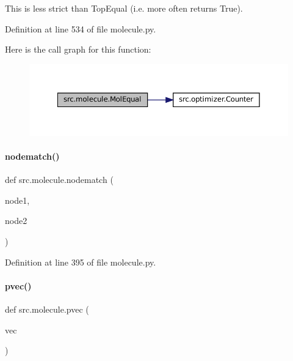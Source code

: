 This is less strict than Top\+Equal (i.\+e. more often returns True). 

Definition at line 534 of file molecule.\+py.

Here is the call graph for this function\+:
\nopagebreak
\begin{figure}[H]
\begin{center}
\leavevmode
\includegraphics[width=350pt]{namespacesrc_1_1molecule_a6b9b3403d57a07cf94d7a47a73e67da8_cgraph}
\end{center}
\end{figure}
\mbox{\label{namespacesrc_1_1molecule_a5928a44288a03b8c3ff61204feaa054b}} 
\paragraph{\texorpdfstring{nodematch()}{nodematch()}}
{\footnotesize\ttfamily def src.\+molecule.\+nodematch (\begin{DoxyParamCaption}\item[{}]{node1,  }\item[{}]{node2 }\end{DoxyParamCaption})}



Definition at line 395 of file molecule.\+py.

\mbox{\label{namespacesrc_1_1molecule_a5faf08001b21d2b7dae569cb9aecba15}} 
\paragraph{\texorpdfstring{pvec()}{pvec()}}
{\footnotesize\ttfamily def src.\+molecule.\+pvec (\begin{DoxyParamCaption}\item[{}]{vec }\end{DoxyParamCaption})}



